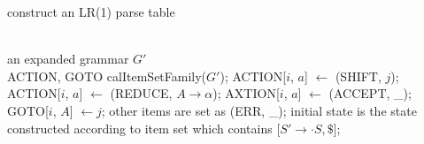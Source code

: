 \documentclass[11pt]{article}
\begin{document}
\begin{algorithm}[h]         %
\caption{construct an LR(1) parse table}             %
\label{alg: lr1construct}
\begin{algorithmic}[1]                %
\REQUIRE ~~\\                          %
    an expanded grammar $G'$
\ENSURE ~~\\                           %
	ACTION, GOTO
\STATE calItemSetFamily($G'$);
	\STATE ACTION[$i$, $a$] $\leftarrow$ (SHIFT, $j$);
	\STATE ACTION[$i$, $a$] $\leftarrow$ (REDUCE, $A \rightarrow \alpha$);
	\STATE AXTION[$i$, $a$] $\leftarrow$ (ACCEPT, \_);
\ENDIF
{}
	\STATE GOTO[$i$, $A$] $\leftarrow j$;
\ENDIF
\STATE other items are set as (ERR, \_);
\STATE initial state is the state constructed according to item set which contains [$S' \rightarrow \cdot S, \$$];
\end{algorithmic}
\end{algorithm}
\end{document}
